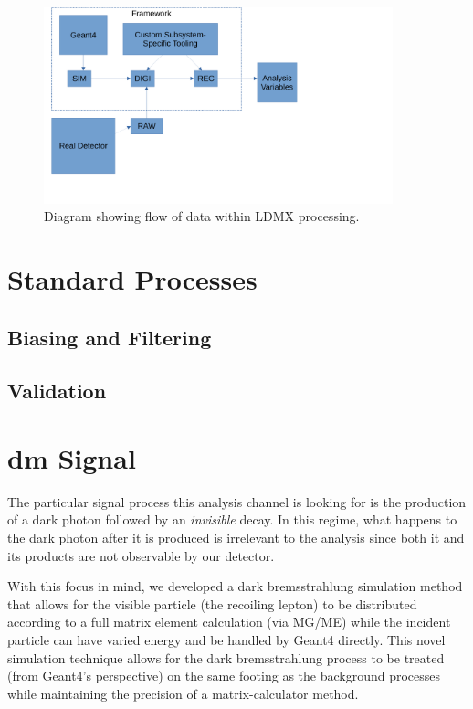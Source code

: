 \begin{figure}
    \centering
    \includegraphics[width=0.9\textwidth]{figures/ldmx/simulation/data-flow.pdf}
    \caption{
        Diagram showing flow of data within LDMX processing.
    }
    \label{fig:ldmx:sim:data-flow}
\end{figure}

\section{Standard Processes}

\subsection{Biasing and Filtering}

\subsection{Validation}

\section{\gls{dm} Signal}
The particular signal process this analysis channel is looking for is the
production of a dark photon followed by an \emph{invisible} decay. In this
regime, what happens to the dark photon after it is produced is irrelevant
to the analysis since both it and its products are not observable by our
detector.

With this focus in mind, we developed a dark bremsstrahlung simulation method
that allows for the visible particle (the recoiling lepton) to be distributed
according to a full matrix element calculation (via MG/ME) while the incident
particle can have varied energy and be handled by Geant4 directly. This novel
simulation technique allows for the dark bremsstrahlung process to be treated
(from Geant4's perspective) on the same footing as the background processes
while maintaining the precision of a matrix-calculator method.

